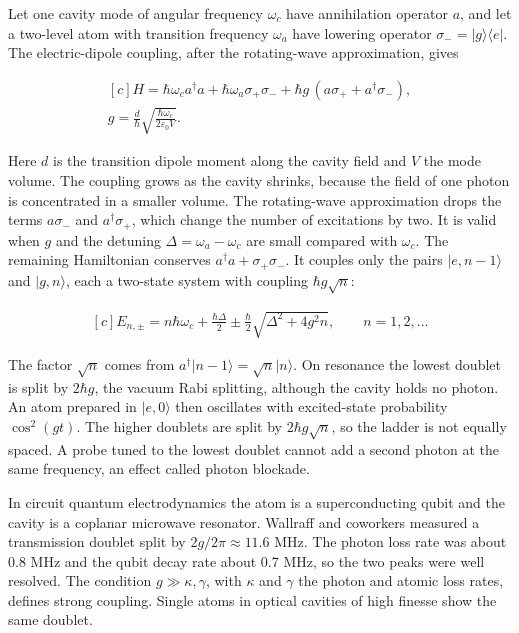 \documentclass[11pt,oneside]{book}
\newenvironment{centeredalign}{\[\begin{gathered}[c]}{\end{gathered}\]}
\newcommand{\ket}[1]{\lvert #1\rangle}
\newcommand{\bra}[1]{\langle #1\rvert}
\begin{document}
Let one cavity mode of angular frequency \(\omega_c\) have annihilation operator \(a\), and let a two-level atom with transition frequency \(\omega_a\) have lowering operator \(\sigma_-=\ket{g}\bra{e}\). The electric-dipole coupling, after the rotating-wave approximation, gives

\begin{centeredalign}
H=\hbar\omega_c a^\dagger a+\hbar\omega_a\sigma_+\sigma_-
+\hbar g\,(a\sigma_++a^\dagger\sigma_-),\\
g=\frac{d}{\hbar}\sqrt{\frac{\hbar\omega_c}{2\varepsilon_0V}}.
\end{centeredalign}

Here \(d\) is the transition dipole moment along the cavity field and \(V\) the mode volume. The coupling grows as the cavity shrinks, because the field of one photon is concentrated in a smaller volume. The rotating-wave approximation drops the terms \(a\sigma_-\) and \(a^\dagger\sigma_+\), which change the number of excitations by two. It is valid when \(g\) and the detuning \(\Delta=\omega_a-\omega_c\) are small compared with \(\omega_c\). The remaining Hamiltonian conserves \(a^\dagger a+\sigma_+\sigma_-\). It couples only the pairs \(\ket{e,n-1}\) and \(\ket{g,n}\), each a two-state system with coupling \(\hbar g\sqrt n\):

\begin{centeredalign}
E_{n,\pm}=n\hbar\omega_c+\frac{\hbar\Delta}{2}\pm\frac{\hbar}{2}\sqrt{\Delta^2+4g^2n},
\qquad n=1,2,\dots
\end{centeredalign}

The factor \(\sqrt n\) comes from \(a^\dagger\ket{n-1}=\sqrt n\ket{n}\). On resonance the lowest doublet is split by \(2\hbar g\), the vacuum Rabi splitting, although the cavity holds no photon. An atom prepared in \(\ket{e,0}\) then oscillates with excited-state probability \(\cos^2(gt)\). The higher doublets are split by \(2\hbar g\sqrt n\), so the ladder is not equally spaced. A probe tuned to the lowest doublet cannot add a second photon at the same frequency, an effect called photon blockade.

In circuit quantum electrodynamics the atom is a superconducting qubit and the cavity is a coplanar microwave resonator. Wallraff and coworkers measured a transmission doublet split by \(2g/2\pi\approx11.6\) MHz. The photon loss rate was about 0.8 MHz and the qubit decay rate about 0.7 MHz, so the two peaks were well resolved. The condition \(g\gg\kappa,\gamma\), with \(\kappa\) and \(\gamma\) the photon and atomic loss rates, defines strong coupling. Single atoms in optical cavities of high finesse show the same doublet.
\end{document}
